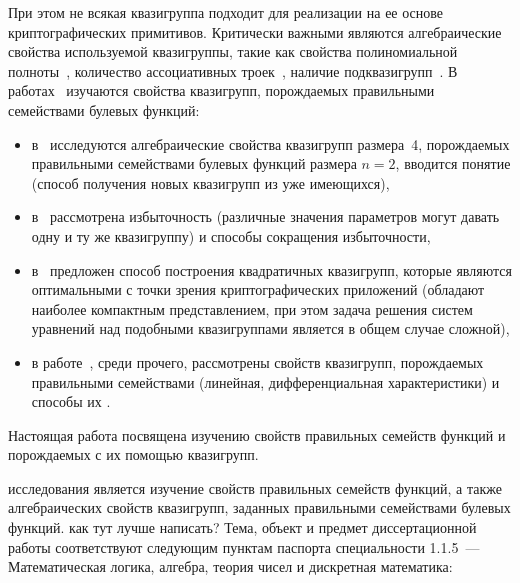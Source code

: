     При этом не всякая квазигруппа подходит для реализации на ее основе криптографических примитивов.
    Критически важными являются алгебраические свойства используемой квазигруппы, такие как свойства полиномиальной полноты~\cite{hagemann, nipkow1990unification, horvath2008}, количество ассоциативных троек~\cite{kepka1980note, kotzig83, ass_summary}, наличие подквазигрупп~\cite{sobyanin19, galatenko21subquasi}.
    В работах~\cite{piven18, piven19, galatenko20quad, shvaryov24} изучаются свойства квазигрупп, порождаемых правильными семействами булевых функций:
    \begin{itemize}
        \item в~\cite{piven18} исследуются алгебраические свойства квазигрупп размера~4, порождаемых правильными семействами булевых функций размера $n = 2$, вводится понятие  (способ получения новых квазигрупп из уже имеющихся),
        \item в~\cite{piven19} рассмотрена избыточность  (различные значения параметров могут давать одну и ту же квазигруппу) и способы сокращения избыточности,
        \item в~\cite{galatenko20quad} предложен способ построения квадратичных квазигрупп, которые являются оптимальными с точки зрения криптографических приложений (обладают наиболее компактным представлением, при этом задача решения систем уравнений над подобными квазигруппами является в общем случае сложной),
        \item в работе~\cite{shvaryov24}, среди прочего, рассмотрены  свойств квазигрупп, порождаемых правильными семействами (линейная, дифференциальная характеристики) и способы их .
    \end{itemize}
    Настоящая работа посвящена изучению свойств правильных семейств функций и порождаемых с их помощью квазигрупп. 


\ifsynopsis
\else
\fi

{\aim} исследования является изучение свойств правильных семейств функций, а также алгебраических свойств квазигрупп, заданных правильными семействами булевых функций.
как тут лучше написать?
Тема, объект и предмет диссертационной работы соответствуют следующим пунктам паспорта специальности 1.1.5~--- Математическая логика, алгебра, теория чисел и дискретная математика: 


